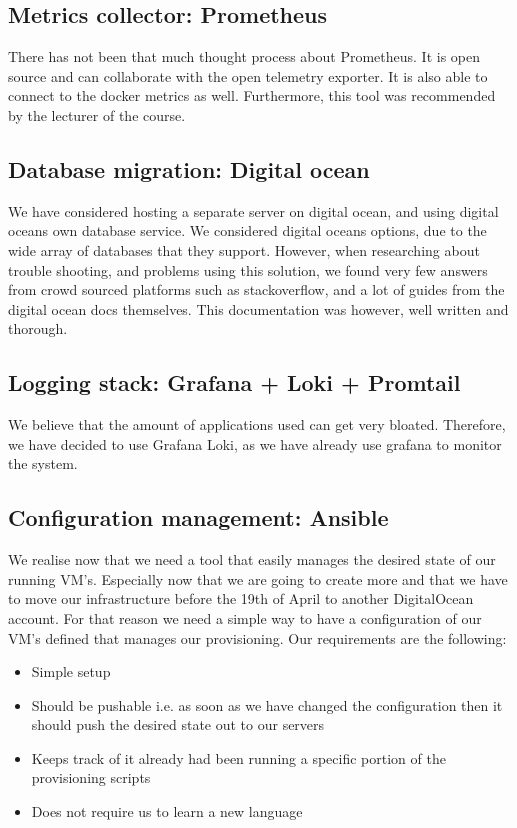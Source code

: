 \subsection{Metrics collector: Prometheus}
There has not been that much thought process about Prometheus. It is open source and can collaborate with the open telemetry exporter. It is also able to connect to the docker metrics as well. Furthermore, this tool was recommended by the lecturer of the course.

\subsection{Database migration: Digital ocean}
We have considered hosting a separate server on digital ocean, and using digital oceans own database service. We considered digital oceans options, due to the wide array of databases that they support. However, when researching about trouble shooting, and problems using this solution, we found very few answers from crowd sourced platforms such as stackoverflow, and a lot of guides from the digital ocean docs themselves. This documentation was however, well written and thorough.

\subsection{Logging stack: Grafana + Loki + Promtail} %

We believe that the amount of applications used can get very bloated. Therefore, we have decided to use Grafana Loki, as we have already use grafana to monitor the system.

\subsection{Configuration management: Ansible}
We realise now that we need a tool that easily manages the desired state of our running VM’s. Especially now that we are going to create more and that we have to move our infrastructure before the 19th of April to another DigitalOcean account. For that reason we need a simple way to have a configuration of our VM’s defined that manages our provisioning. Our requirements are the following:

\begin{itemize}
    \item Simple setup
    \item Should be pushable i.e. as soon as we have changed the configuration then it should push the desired state out to our servers
    \item Keeps track of it already had been running a specific portion of the provisioning scripts
    \item Does not require us to learn a new language
\end{itemize}

